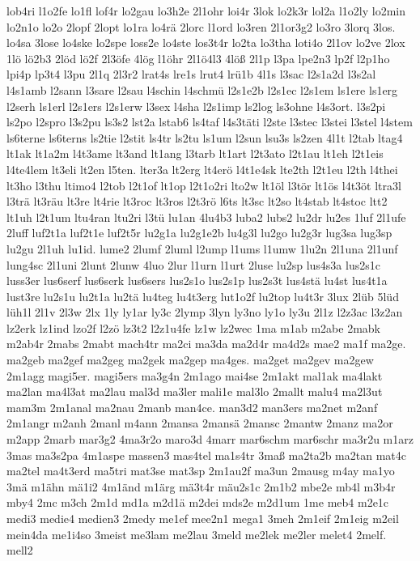 {lob4ri
l1o2fe
lo1fl
lof4r
lo2gau
lo3h2e
2l1ohr
loi4r
3lok
lo2k3r
lol2a
l1o2ly
lo2min
lo2n1o
lo2o
2lopf
2lopt
lo1ra
lo4rä
2lorc
l1ord
lo3ren
2l1or3g2
lo3ro
3lorq
3los.
lo4sa
3lose
lo4ske
lo2spe
loss2e
lo4ste
los3t4r
lo2ta
lo3tha
loti4o
2l1ov
lo2ve
2lox
1lö
lö2b3
2löd
lö2f
2l3öfe
4lög
l1öhr
2l1ö4l3
4löß
2l1p
l3pa
lpe2n3
lp2f
l2p1ho
lpi4p
lp3t4
l3pu
2l1q
2l3r2
lrat4s
lre1s
lrut4
lrü1b
4l1s
l3sac
l2s1a2d
l3s2al
l4s1amb
l2sann
l3sare
l2sau
l4schin
l4schmü
l2s1e2b
l2s1ec
l2s1em
ls1ere
ls1erg
l2serh
ls1erl
l2s1ers
l2s1erw
l3sex
l4sha
l2s1imp
ls2log
ls3ohne
l4s3ort.
l3s2pi
ls2po
l2spro
l3s2pu
ls3s2
lst2a
lstab6
ls4taf
l4s3täti
l2ste
l3stec
l3stei
l3stel
l4stem
ls6terne
ls6terns
ls2tie
l2stit
ls4tr
ls2tu
ls1um
l2sun
lsu3s
ls2zen
4l1t
l2tab
ltag4
lt1ak
lt1a2m
l4t3ame
lt3and
lt1ang
l3tarb
lt1art
l2t3ato
l2t1au
lt1eh
l2t1eis
l4te4lem
lt3eli
lt2en
l5ten.
lter3a
lt2erg
lt4erö
l4t1e4sk
lte2th
l2t1eu
l2th
l4thei
lt3ho
l3thu
ltimo4
l2tob
l2t1of
lt1op
l2t1o2ri
lto2w
lt1öl
l3tör
lt1ös
l4t3öt
ltra3l
l3trä
lt3räu
lt3re
lt4rie
lt3roc
lt3ros
l2t3rö
l6ts
lt3sc
lt2so
lt4stab
lt4stoc
ltt2
lt1uh
l2t1um
ltu4ran
ltu2ri
l3tü
lu1an
4lu4b3
luba2
lubs2
lu2dr
lu2es
1luf
2l1ufe
2luff
luf2t1a
luf2t1e
luf2t5r
lu2g1a
lu2g1e2b
lu4g3l
lu2go
lu2g3r
lug3sa
lug3sp
lu2gu
2l1uh
lu1id.
lume2
2lumf
2luml
l2ump
l1ums
l1umw
1lu2n
2l1una
2l1unf
lung4sc
2l1uni
2lunt
2lunw
4luo
2lur
l1urn
l1urt
2luse
lu2sp
lus4s3a
lus2s1c
luss3er
lus6serf
lus6serk
lus6sers
lus2s1o
lus2s1p
lus2s3t
lus4stä
lu4st
lus4t1a
lust3re
lu2s1u
lu2t1a
lu2tä
lu4teg
lu4t3erg
lut1o2f
lu2top
lu4t3r
3lux
2lüb
5lüd
lüh1l
2l1v
2l3w
2lx
1ly
ly1ar
ly3c
2lymp
3lyn
ly3no
ly1o
ly3u
2l1z
l2z3ac
l3z2an
lz2erk
lz1ind
lzo2f
l2zö
lz3t2
l2z1u4fe
lz1w
lz2wec
1ma
m1ab
m2abe
2mabk
m2ab4r
2mabs
2mabt
mach4tr
ma2ci
ma3da
ma2d4r
ma4d2s
mae2
ma1f
ma2ge.
ma2geb
ma2gef
ma2geg
ma2gek
ma2gep
ma4ges.
ma2get
ma2gev
ma2gew
2m1agg
magi5er.
magi5ers
ma3g4n
2m1ago
mai4se
2m1akt
mal1ak
ma4lakt
ma2lan
ma4l3at
ma2lau
mal3d
ma3ler
mali1e
mal3lo
2mallt
malu4
ma2l3ut
mam3m
2m1anal
ma2nau
2manb
man4ce.
man3d2
man3ers
ma2net
m2anf
2m1angr
m2anh
2manl
m4ann
2mansa
2mansä
2mansc
2mantw
2manz
ma2or
m2app
2marb
mar3g2
4ma3r2o
maro3d
4marr
mar6schm
mar6schr
ma3r2u
m1arz
3mas
ma3s2pa
4m1aspe
massen3
mas4tel
ma1s4tr
3maß
ma2ta2b
ma2tan
mat4c
ma2tel
ma4t3erd
ma5tri
mat3se
mat3sp
2m1au2f
ma3un
2mausg
m4ay
ma1yo
3mä
m1ähn
mä1i2
4m1änd
m1ärg
mä3t4r
mäu2s1c
2m1b2
mbe2e
mb4l
m3b4r
mby4
2mc
m3ch
2m1d
md1a
m2d1ä
m2dei
mds2e
m2d1um
1me
meb4
m2e1c
medi3
medie4
medien3
2medy
me1ef
mee2n1
mega1
3meh
2m1eif
2m1eig
m2eil
mein4da
me1i4so
3meist
me3lam
me2lau
3meld
me2lek
me2ler
melet4
2melf.
mell2
}
